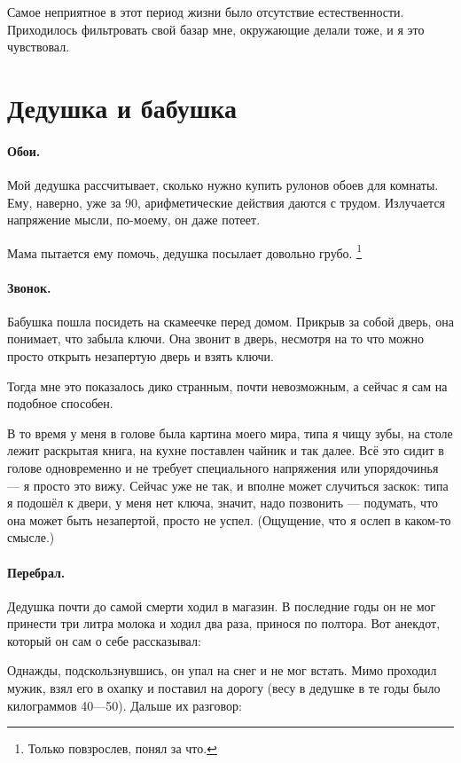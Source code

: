 \documentclass{book}
\begin{document}
Самое неприятное в этот период жизни было отсутствие естественности.
Приходилось фильтровать свой базар мне, окружающие делали тоже, и я это чувствовал.

\section*{Дедушка и бабушка}

\paragraph{Обои.} 
Мой дедушка рассчитывает, сколько нужно купить рулонов обоев для комнаты.
Ему, наверно, уже за 90, 
арифметические действия даются с трудом.
Излучается напряжение мысли, по-моему, он даже потеет.

Мама пытается ему помочь, 
дедушка посылает довольно грубо.%
\footnote{Только повзрослев, понял за что.}

\paragraph{Звонок.}
Бабушка пошла посидеть на скамеечке перед домом.
Прикрыв за собой дверь, она понимает, что забыла ключи.
Она звонит в дверь, несмотря на то что можно просто открыть незапертую дверь и взять ключи.

Тогда мне это показалось дико странным, почти невозможным, а сейчас я сам на подобное способен.

В то время у меня в голове была картина моего мира, типа я чищу зубы, на столе лежит раскрытая книга, на кухне поставлен чайник и так далее.
Всё это сидит в голове одновременно и не требует специального напряжения или упорядочинья --- я просто это вижу.
Сейчас уже не так, и вполне может случиться заскок: типа я подошёл к двери, у меня нет ключа, значит, надо позвонить --- подумать, что она может быть незапертой, просто не успел.
(Ощущение, что я ослеп в каком-то смысле.)

\paragraph{Перебрал.}
Дедушка почти до самой смерти ходил в магазин.
В последние годы он не мог принести три литра молока и ходил два раза, принося по полтора.
Вот анекдот, который он сам о себе рассказывал:

Однажды, подскользнувшись, он упал на снег и не мог встать.
Мимо проходил мужик, взял его в охапку и поставил на дорогу (весу в дедушке в те годы было килограммов 40---50).
Дальше их разговор:
\end{document}
